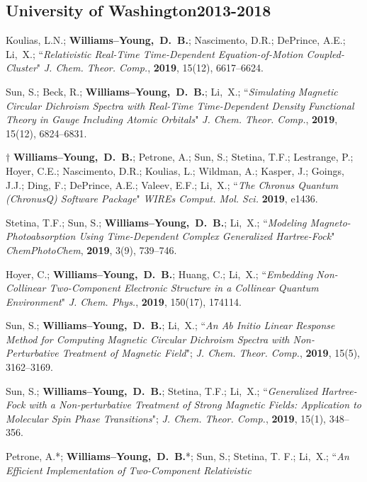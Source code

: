 \documentclass[10pt]{res} %
\newcommand*\me[0]{{\bf Williams--Young,~D.~B.}}
\newcommand*\xsli[0]{Li,~X.}
\begin{document}
\begin{resume}
\subsection{University of Washington\hfill 2013-2018}

\begin{etaremune}
  \item Koulias, L.N.; \me; Nascimento, D.R.; DePrince, A.E.; \xsli;
        ``\emph{Relativistic Real-Time Time-Dependent Equation-of-Motion Coupled-Cluster}"
        \emph{J. Chem. Theor. Comp.}, \textbf{2019}, 15(12), 6617--6624.
  \item Sun, S.; Beck, R.; \me; \xsli;
        ``\emph{Simulating Magnetic Circular Dichroism Spectra with Real-Time Time-Dependent
          Density Functional Theory in Gauge Including Atomic Orbitals}"
        \emph{J. Chem. Theor. Comp.}, \textbf{2019}, 15(12), 6824--6831.
  \item $\dagger$ \me; Petrone, A.; Sun, S.; Stetina, T.F.; Lestrange, P.; Hoyer, C.E.; 
        Nascimento, D.R.; Koulias, L.; Wildman, A.; Kasper, J.; Goings, J.J.; 
        Ding, F.; DePrince, A.E.; Valeev, E.F.; \xsli;
        ``\emph{The Chronus Quantum (ChronusQ) Software Package}"
        \emph{WIREs Comput. Mol. Sci.} \textbf{2019}, e1436.
  \item Stetina, T.F.; Sun, S.; \me; \xsli;
        ``\emph{Modeling Magneto-Photoabsorption Using Time-Dependent Complex 
          Generalized Hartree-Fock}"
        \emph{ChemPhotoChem}, \textbf{2019}, 3(9), 739--746.
  \item Hoyer, C.; \me; Huang, C.; \xsli;
        ``\emph{Embedding Non-Collinear Two-Component Electronic Structure in 
          a Collinear Quantum Environment}"
        \emph{J. Chem. Phys.}, \textbf{2019}, 150(17), 174114.
  \item Sun, S.; \me; \xsli;
        ``\emph{An Ab Initio Linear Response Method for Computing Magnetic 
          Circular Dichroism Spectra with Non-Perturbative Treatment of 
          Magnetic Field}";
        \emph{J. Chem. Theor. Comp.}, \textbf{2019}, 15(5), 3162--3169.
  \item Sun, S.; \me; Stetina, T.F.; \xsli;
        ``\emph{Generalized Hartree-Fock with a Non-perturbative Treatment 
          of Strong Magnetic Fields: Application to Molecular Spin Phase 
          Transitions}";
        \emph{J. Chem. Theor. Comp.}, \textbf{2019}, 15(1), 348--356.
  \item Petrone, A.*; \me*; Sun, S.; Stetina, T. F.; \xsli;
        ``\emph{An Efficient Implementation of Two-Component Relativistic 
}
\end{etaremune}
\end{resume}
\end{document}
